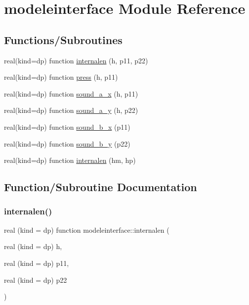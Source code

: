 \hypertarget{namespacemodeleinterface}{}\section{modeleinterface Module Reference}
\label{namespacemodeleinterface}
\subsection*{Functions/\+Subroutines}
\begin{DoxyCompactItemize}
\item 
real(kind=dp) function \mbox{\hyperlink{namespacemodeleinterface_a4d0b51322903b5a095f04aaafb1a8c5f}{internalen}} (h, p11, p22)
\item 
real(kind=dp) function \mbox{\hyperlink{namespacemodeleinterface_ad34088de8c0162343994153e8f34921e}{press}} (h, p11)
\item 
real(kind=dp) function \mbox{\hyperlink{namespacemodeleinterface_a1505c575aa44b45a8509fe827f28bc8d}{sound\+\_\+a\+\_\+x}} (h, p11)
\item 
real(kind=dp) function \mbox{\hyperlink{namespacemodeleinterface_aea42339ec55b6d0e7333dcd4c2d6041f}{sound\+\_\+a\+\_\+y}} (h, p22)
\item 
real(kind=dp) function \mbox{\hyperlink{namespacemodeleinterface_aa422a9d23665a7fa175a3458f15d6be2}{sound\+\_\+b\+\_\+x}} (p11)
\item 
real(kind=dp) function \mbox{\hyperlink{namespacemodeleinterface_ae6539d207be975bdb5b8c45826062a30}{sound\+\_\+b\+\_\+y}} (p22)
\item 
real(kind=dp) function \mbox{\hyperlink{namespacemodeleinterface_a6b953eda7a6bc3e81e6ae451b273b548}{internalen}} (hm, hp)
\end{DoxyCompactItemize}


\subsection{Function/\+Subroutine Documentation}
\mbox{\label{namespacemodeleinterface_a4d0b51322903b5a095f04aaafb1a8c5f}} 
\subsubsection{\texorpdfstring{internalen()}{internalen()}\hspace{0.1cm}{\footnotesize\ttfamily [1/2]}}
{\footnotesize\ttfamily real (kind = dp) function modeleinterface\+::internalen (\begin{DoxyParamCaption}\item[{real (kind = dp)}]{h,  }\item[{real (kind = dp)}]{p11,  }\item[{real (kind = dp)}]{p22 }\end{DoxyParamCaption})}

